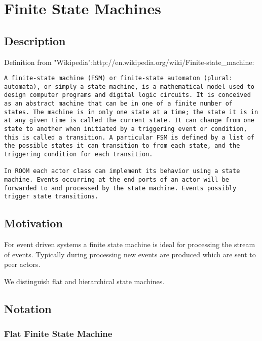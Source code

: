 \section{Finite State Machines}

\subsection{Description}

Definition from "Wikipedia":http://en.wikipedia.org/wiki/Finite-state\_machine:

\begin{verbatim}
A finite-state machine (FSM) or finite-state automaton (plural: automata), or simply a state machine, is a mathematical model used to design computer programs and digital logic circuits. It is conceived as an abstract machine that can be in one of a finite number of states. The machine is in only one state at a time; the state it is in at any given time is called the current state. It can change from one state to another when initiated by a triggering event or condition, this is called a transition. A particular FSM is defined by a list of the possible states it can transition to from each state, and the triggering condition for each transition.

In ROOM each actor class can implement its behavior using a state machine. Events occurring at the end ports of an actor will be forwarded to and processed by the state machine. Events possibly trigger state transitions.
\end{verbatim}

\subsection{Motivation}

For event driven systems a finite state machine is ideal for processing the stream of events. Typically during processing new events are produced which are sent to peer actors.

We distinguish flat and hierarchical state machines.

\subsection{Notation}

\subsubsection{Flat Finite State Machine}

